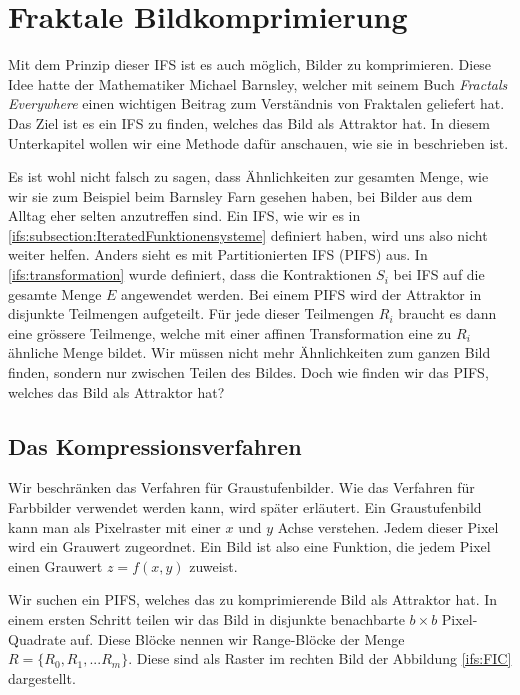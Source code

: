 %
%
%
\section{Fraktale Bildkomprimierung
\label{ifs:section:teil3}}
Mit dem Prinzip dieser IFS ist es auch möglich, Bilder zu komprimieren.
Diese Idee hatte der Mathematiker Michael Barnsley, welcher mit seinem Buch {\em Fractals Everywhere} einen wichtigen Beitrag zum Verständnis von Fraktalen geliefert hat.
Das Ziel ist es ein IFS zu finden, welches das Bild als Attraktor hat.
In diesem Unterkapitel wollen wir eine Methode dafür anschauen, wie sie in \cite{ifs:Rousseau2012} beschrieben ist.

Es ist wohl nicht falsch zu sagen, dass Ähnlichkeiten zur gesamten Menge, wie wir sie zum Beispiel beim Barnsley Farn gesehen haben, bei Bilder aus dem Alltag eher selten anzutreffen sind.
Ein IFS, wie wir es in \ref{ifs:subsection:IteratedFunktionensysteme} definiert haben, wird uns also nicht weiter helfen.
Anders sieht es mit Partitionierten IFS (PIFS) \cite{ifs:pifs} aus.
In \ref{ifs:transformation} wurde definiert, dass die Kontraktionen $S_i$ bei IFS auf die gesamte Menge $E$ angewendet werden.
Bei einem PIFS wird der Attraktor in disjunkte Teilmengen aufgeteilt. 
Für jede dieser Teilmengen $R_i$ braucht es dann eine grössere Teilmenge, welche mit einer affinen Transformation eine zu $R_i$ ähnliche Menge bildet.
Wir müssen nicht mehr Ähnlichkeiten zum ganzen Bild finden, sondern nur zwischen Teilen des Bildes.
Doch wie finden wir das PIFS, welches das Bild als Attraktor hat?

\subsection{Das Kompressionsverfahren
\label{ifs:subsection:malorum}}
Wir beschränken das Verfahren für Graustufenbilder. Wie das Verfahren für Farbbilder verwendet werden kann, wird später erläutert.
Ein Graustufenbild kann man als Pixelraster mit einer $x$ und $y$ Achse verstehen.
Jedem dieser Pixel wird ein Grauwert zugeordnet.
Ein Bild ist also eine Funktion, die jedem Pixel einen Grauwert \(z = f(x,y)\) zuweist.

Wir suchen ein PIFS, welches das zu komprimierende Bild als Attraktor hat.
In einem ersten Schritt teilen wir das Bild in disjunkte benachbarte $b \times b$ Pixel-Quadrate auf. Diese Blöcke nennen wir Range-Blöcke der Menge $R=\{R_0,R_1,...R_m\}$. Diese sind als Raster im rechten Bild der Abbildung \ref{ifs:FIC} dargestellt.


